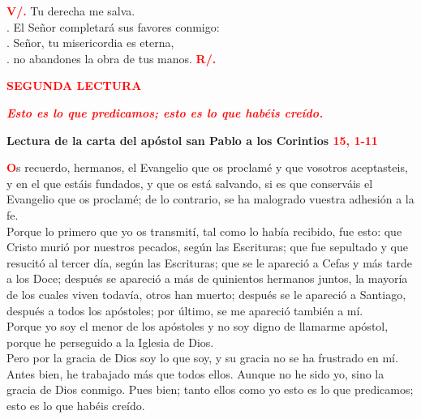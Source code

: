 \documentclass[12pt, letterpaper]{article}
\begin{document}
    {\bfseries \textcolor{red}{V/.}} \hspace{1cm} Tu derecha me salva.\\
    . \hspace{2.5cm} El Se\~nor completar\'a sus favores conmigo:\\
    . \hspace{2.5cm} Se\~nor, tu misericordia es eterna,\\
    . \hspace{2.5cm} no abandones la obra de tus manos.
    \hspace{1cm} {\bfseries \textcolor{red}{R/.}}

    \newpage

    \begin{center}
    \Large {\bfseries \textcolor{red}{SEGUNDA LECTURA}}
    \end{center}

    \begin{center}
    \large {\bfseries \textit{ \textcolor{red}{Esto es lo que predicamos; esto es lo que hab\'eis cre\'ido.}}}
    \end{center}

    \Large {\bfseries Lectura de la carta del ap\'ostol san Pablo a los Corintios \hspace{1cm} \textcolor{red}{15, 1-11}}

    \lettrine[lines=2]{\bfseries \textcolor{red}{O}}{}\Large s recuerdo, hermanos, el Evangelio que os proclam\'e y que vosotros aceptasteis, y en el que est\'ais fundados, y que os est\'a salvando, si es que conserv\'ais el Evangelio que os proclam\'e; de lo contrario, se ha malogrado vuestra adhesi\'on a la fe.\\
    Porque lo primero que yo os transmit\'i, tal como lo hab\'ia recibido, fue esto: que Cristo muri\'o por nuestros pecados, seg\'un las Escrituras; que fue sepultado y que resucit\'o al tercer d\'ia, seg\'un las Escrituras; que se le apareci\'o a Cefas y m\'as tarde a los Doce; despu\'es se apareci\'o a m\'as de quinientos hermanos juntos, la mayor\'ia de los cuales viven todav\'ia, otros han muerto; despu\'es se le apareci\'o a Santiago, despu\'es a todos los ap\'ostoles; por \'ultimo, se me apareci\'o tambi\'en a m\'i.\\
    Porque yo soy el menor de los ap\'ostoles y no soy digno de llamarme ap\'ostol, porque he perseguido a la Iglesia de Dios.\\
    Pero por la gracia de Dios soy lo que soy, y su gracia no se ha frustrado en m\'i. Antes bien, he trabajado m\'as que todos ellos. Aunque no he sido yo, sino la gracia de Dios conmigo. Pues bien; tanto ellos como yo esto es lo que predicamos; esto es lo que hab\'eis cre\'ido.
\end{document}
